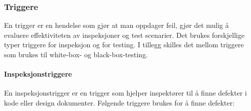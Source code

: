 \subsubsection{Triggere}

En trigger er en hendelse som gjør at man oppdager feil, gjør det mulig
å evaluere effektiviteten av inspeksjoner og test scenarier. Det brukes
forskjellige typer triggere for inspeksjon og for testing. I tillegg
skilles det mellom triggere som brukes til white-box- og
black-box-testing.

\paragraph{Inspeksjonstriggere}

En inspeksjonstrigger er en trigger som hjelper inspektører til å finne
defekter i kode eller design dokumenter. Følgende triggere brukes for å
finne defekter:

